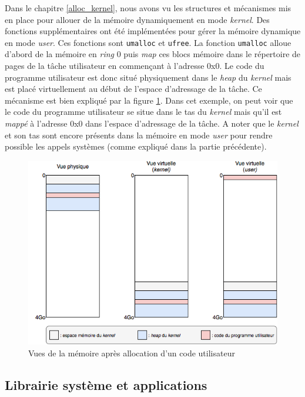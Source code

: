 Dans le chapitre \ref{alloc_kernel}, nous avons vu les structures et mécanismes
mis en place pour allouer de la mémoire dynamiquement en mode \textit{kernel}.
Des fonctions supplémentaires ont été implémentées pour gérer la mémoire dynamique en
mode \textit{user}. Ces fonctions sont \texttt{umalloc} et
\texttt{ufree}. La fonction \texttt{umalloc} alloue d'abord
de la mémoire en \textit{ring} 0 puis \textit{map} ces blocs mémoire
dans le répertoire de pages de la tâche utilisateur en commençant à l'adresse 0x0.
Le code du programme utilisateur est donc situé physiquement dans le \textit{heap}
du \textit{kernel} mais est placé virtuellement au début de l'espace d'adressage
de la tâche. Ce mécanisme est bien expliqué par la figure \ref{alloc_user}.
Dans cet exemple, on peut voir que le code du programme utilisateur se situe
dans le tas du \textit{kernel} mais qu'il est \textit{mappé} à l'adresse 0x0
dans l'espace d'adressage de la tâche. A noter que le \textit{kernel} et son tas
sont encore présents dans la mémoire en mode \textit{user} pour rendre possible
les appels systèmes (comme expliqué dans la partie précédente).

\begin{figure}[!h]
  \centering
  \includegraphics[scale=.7]{images/alloc_user.png}
  \caption{Vues de la mémoire après allocation d'un code utilisateur}
  \label{alloc_user}
\end{figure}


\subsection{Librairie système et applications}